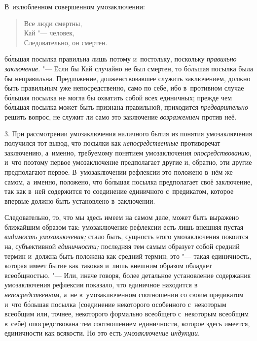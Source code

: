 В~излюбленном совершенном умозаключении:

\begin{verse}
Все люди смертны,\\
Кай "--- человек,\\
Следовательно, он смертен.
\end{verse}

\noindent б\'{о}льшая посылка правильна лишь потому и~постольку, поскольку
{\em правильно заключение}. "---
Если бы Кай случайно не был смертен, то б\'{о}льшая посылка была
бы неправильна. Предложение, долженствовавшее служить заключением, должно
быть правильным уже непосредственно, само по себе, ибо в~противном случае
б\'{о}льшая посылка не могла бы охватить собой всех единичных; прежде чем
б\'{о}льшая посылка может быть признана правильной, приходится
{\em предварительно} решить вопрос, не служит ли само это заключение
{\em возражением} против неё.

3. При рассмотрении умозаключения наличного бытия из понятия
умозаключения получился тот вывод, что посылки как {\em непосредственные}
противоречат заключению, а~именно, требуемому понятием
умозаключения {\em опосредствованию,}
и~что поэтому первое умозаключение предполагает другие и,
обратно, эти другие предполагают первое. В~умозаключении рефлексии это
положено в~нём же самом, а~именно, положено, что б\'{о}льшая
посылка предполагает своё заключение, так как в~ней содержится то
соединение единичного с~предикатом, которое впервые должно быть установлено
в~заключении.

Следовательно, то, что мы здесь имеем на самом деле, может
быть выражено ближайшим образом так: умозаключение рефлексии есть лишь
внешняя пустая {\em видимость
умозаключения;} стало быть, сущность этого умозаключения
покоится на, субъективной {\em единичности;}
последняя тем самым образует собой средний термин и~должна
быть положена как средний термин; это "--- такая единичность,
которая имеет бытие как таковая и~лишь внешним образом обладает
всеобщностью. "--- Или, иначе говоря, более детальное
установление содержания умозаключения рефлексии показало, что единичное
находится в {\em непосредственном,}
а~не в~умозаключенном соотношении со своим предикатом и~что
б\'{о}льшая посылка (соединение некоторого особенного с~некоторым всеобщим или,
точнее, некоторого формально всеобщего с~некоторым всеобщим в~себе)
опосредствована тем соотношением единичности, которое здесь имеется,
единичности как всякости. Но это есть {\em умозаключение индукции}.


